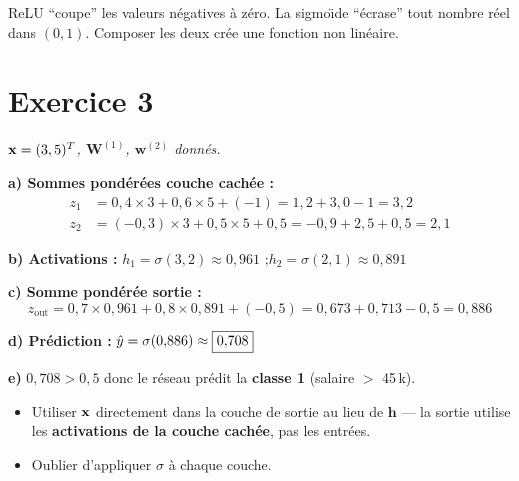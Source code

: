 \begin{retenirbox}
    ReLU ``coupe'' les valeurs n\'{e}gatives \`{a} z\'{e}ro. La sigmo\"{\i}de ``\'{e}crase'' tout nombre r\'{e}el dans $(0, 1)$.
    Composer les deux cr\'{e}e une fonction non lin\'{e}aire.
\end{retenirbox}

\section*{Exercice 3 \hfill \exofondamental}
\textit{$\mathbf{x} = (3, 5)^T$, $\mathbf{W}^{(1)}$, $\mathbf{w}^{(2)}$ donn\'{e}s.}

\separateur

\textbf{a) Sommes pond\'{e}r\'{e}es couche cach\'{e}e :}
\begin{align*}
    z_1 &= 0{,}4 \times 3 + 0{,}6 \times 5 + (-1) = 1{,}2 + 3{,}0 - 1 = \boxed{3{,}2} \\
    z_2 &= (-0{,}3) \times 3 + 0{,}5 \times 5 + 0{,}5 = -0{,}9 + 2{,}5 + 0{,}5 = \boxed{2{,}1}
\end{align*}

\textbf{b) Activations :}
$h_1 = \sigma(3{,}2) \approx \boxed{0{,}961}$ \quad;\quad $h_2 = \sigma(2{,}1) \approx \boxed{0{,}891}$

\textbf{c) Somme pond\'{e}r\'{e}e sortie :}
\[
    z_{\text{out}} = 0{,}7 \times 0{,}961 + 0{,}8 \times 0{,}891 + (-0{,}5) = 0{,}673 + 0{,}713 - 0{,}5 = \boxed{0{,}886}
\]

\textbf{d) Pr\'{e}diction :}
$\hat{y} = \sigma(0{,}886) \approx \boxed{0{,}708}$

\textbf{e)} $0{,}708 > 0{,}5$ donc le r\'{e}seau pr\'{e}dit la \textbf{classe 1}
(salaire $>$ 45\,k\texteuro).

\begin{attentionbox}
\begin{itemize}
    \item Utiliser $\mathbf{x}$ directement dans la couche de sortie au lieu de $\mathbf{h}$ --- la sortie utilise les \textbf{activations de la couche cach\'{e}e}, pas les entr\'{e}es.
    \item Oublier d'appliquer $\sigma$ \`{a} chaque couche.
\end{itemize}
\end{attentionbox}

